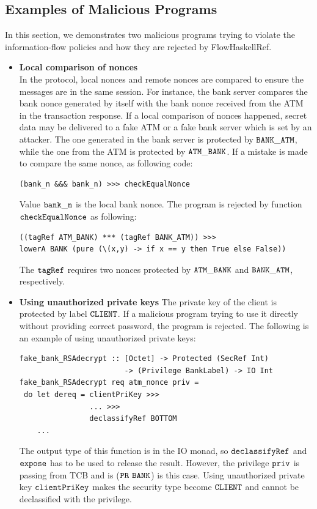 \documentclass[a4paper]{report}
\newcommand{\co}[1]{$\cod{#1}$}
\begin{document}
\subsection{Examples of Malicious Programs}
In this section, we demonstrates two malicious programs trying to violate the information-flow policies and
how they are rejected by FlowHaskellRef.
\begin{itemize}
\item \textbf{Local comparison of nonces} \\
      In the protocol, local nonces and remote nonces are compared to ensure the messages are in the same 
      session. For instance, the bank server compares the bank nonce generated by itself with the bank nonce
      received from the ATM in the transaction response. 
      If a local comparison of nonces happened, secret data may be delivered to a fake ATM or a fake bank server
      which is set by an attacker. 
      The one generated in the bank server is protected by
      \co{BANK\_ATM}, while the one from the ATM is protected by \co{ATM\_BANK}. If a mistake is made to 
      compare the same nonce, as following code:
\begin{Verbatim}[fontsize=\footnotesize]
(bank_n &&& bank_n) >>> checkEqualNonce 
\end{Verbatim}
      Value \co{bank\_n} is the local bank nonce. The program is rejected by function 
      \co{checkEqualNonce} as following:
\begin{Verbatim}[fontsize=\footnotesize]
((tagRef ATM_BANK) *** (tagRef BANK_ATM)) >>>
lowerA BANK (pure (\(x,y) -> if x == y then True else False))
\end{Verbatim}
      The \co{tagRef} requires two nonces protected by \co{ATM\_BANK} and \co{BANK\_ATM}, respectively.

\item \textbf{Using unauthorized private keys}
      The private key of the client is protected by label \co{CLIENT}. If a malicious program trying to
      use it directly without providing correct password, the program is rejected. The following is an
      example of using unauthorized private keys:
\begin{Verbatim}[fontsize=\footnotesize]
fake_bank_RSAdecrypt :: [Octet] -> Protected (SecRef Int)
                        -> (Privilege BankLabel) -> IO Int
fake_bank_RSAdecrypt req atm_nonce priv =
 do let dereq = clientPriKey >>> 
                ... >>>
                declassifyRef BOTTOM
    ...
\end{Verbatim}
      The output type of this function is in the IO monad, so \co{declassifyRef} and \co{expose} has to 
      be used to release the result. However, the privilege \co{priv} is passing from TCB and is
      (\co{PR} \co{BANK}) is this case. Using unauthorized private key \co{clientPriKey} makes the
      security type become \co{CLIENT} and cannot be declassified with the privilege.
\end{itemize}
\end{document}
